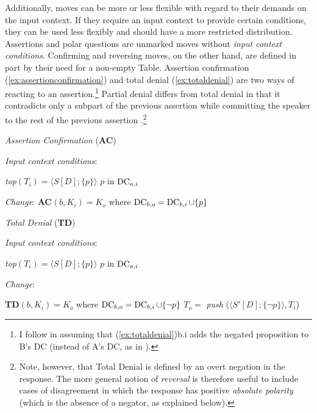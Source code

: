 Additionally, moves can be more or less flexible with regard to their demands on the input context. If they require an input context to provide certain conditions, they can be used less flexibly and should have a more restricted distribution. Assertions and polar questions are unmarked moves without \textit{input context conditions}. Confirming and reversing moves, on the other hand, are defined in part by their need for a non-empty Table. Assertion confirmation (\ref{ex:assertionconfirmation}) and total denial (\ref{ex:totaldenial}) are two ways of reacting to an assertion.\footnote{I follow \citet[14]{Schneider.2017} in assuming that (\ref{ex:totaldenial})b.i adds the negated proposition to B's DC (instead of A's DC, as in \cite[101]{FarkasBruce.2010}).} Partial denial differs from total denial in that it contradicts only a subpart of the previous assertion while committing the speaker to the rest of the previous assertion \citep[101]{FarkasBruce.2010}.\footnote{Note, however, that Total Denial is defined by an overt negation in the response. The more general notion of \textit{reversal} is therefore useful to include cases of disagreement in which the response has positive \textit{absolute polarity} (which is the absence of a negator, as explained below).}

\begin{exe}
\ex\label{ex:assertionconfirmation} \textit{Assertion Confirmation} (\textbf{AC})
	\begin{xlist}
		\ex \textit{Input context conditions}: 
			\begin{xlist}
			\ex \textit{top}$(T_i)=\langle S [D];\{ p \}\rangle$
			\ex $p$ in $\operatorname{DC}_{a,i}$ 
			\end{xlist}
		\ex \textit{Change}: 
			\textbf{AC}$(b,K_i)=K_o$ where $\operatorname{DC}_{b,o}=\operatorname{DC}_{b,i}\cup \{ p \}$ 
	\end{xlist}
\ex\label{ex:totaldenial} \textit{Total Denial} (\textbf{TD}) 
	\begin{xlist}
		\ex \textit{Input context conditions}: 
		\begin{xlist}
			\ex \textit{top}$(T_i)=\langle S [D];\{ p \}\rangle$
			\ex $p$ in $\operatorname{DC}_{a,i}$ 
		\end{xlist}
		\ex \textit{Change}: 
		\begin{xlist}
			\ex \textbf{TD}$(b,K_i)=K_o$ where $\operatorname{DC}_{b,o}=\operatorname{DC}_{b,i}\cup \{\neg p \}$ 
			\ex $T_o=$ \textit{push} ($\langle S' [D];\{\neg p \}\rangle, T_i$) 
		\end{xlist}
	\end{xlist}
\end{exe}

